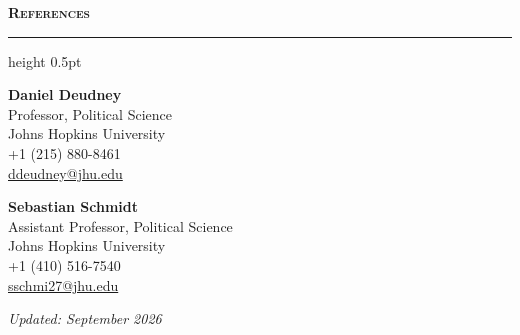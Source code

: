 \documentclass[11pt]{article}
\newcommand{\cvsection}[1]{%
  \vspace{1.0em}%
  {\bfseries\scshape #1}\par
  \vspace{0.25em}\hrule height 0.5pt\vspace{0.7em}}
\begin{document}
\cvsection{References}

\begin{minipage}[t]{0.5\textwidth}
\textbf{Daniel Deudney}\\
Professor, Political Science\\
Johns Hopkins University\\
+1 (215) 880-8461\\
\href{mailto:ddeudney@jhu.edu}{ddeudney@jhu.edu}
\end{minipage}%
\begin{minipage}[t]{0.5\textwidth}
\textbf{Sebastian Schmidt}\\
Assistant Professor, Political Science\\
Johns Hopkins University\\
+1 (410) 516-7540\\
\href{mailto:sschmi27@jhu.edu}{sschmi27@jhu.edu}
\end{minipage}

\vspace{1.4em}
{\footnotesize\itshape Updated: September 2026}
\end{document}
